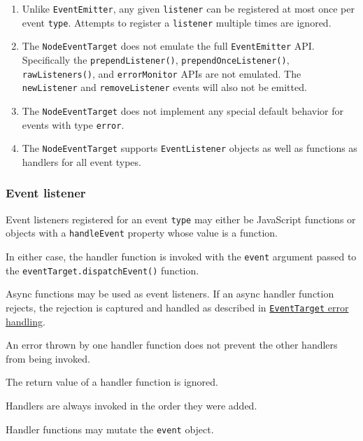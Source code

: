 \begin{enumerate}
\def\labelenumi{\arabic{enumi}.}
\tightlist
\item
  Unlike \texttt{EventEmitter}, any given \texttt{listener} can be
  registered at most once per event \texttt{type}. Attempts to register
  a \texttt{listener} multiple times are ignored.
\item
  The \texttt{NodeEventTarget} does not emulate the full
  \texttt{EventEmitter} API. Specifically the
  \texttt{prependListener()}, \texttt{prependOnceListener()},
  \texttt{rawListeners()}, and \texttt{errorMonitor} APIs are not
  emulated. The \texttt{\textquotesingle{}newListener\textquotesingle{}}
  and \texttt{\textquotesingle{}removeListener\textquotesingle{}} events
  will also not be emitted.
\item
  The \texttt{NodeEventTarget} does not implement any special default
  behavior for events with type
  \texttt{\textquotesingle{}error\textquotesingle{}}.
\item
  The \texttt{NodeEventTarget} supports \texttt{EventListener} objects
  as well as functions as handlers for all event types.
\end{enumerate}

\subsubsection{Event listener}\label{event-listener}

Event listeners registered for an event \texttt{type} may either be
JavaScript functions or objects with a \texttt{handleEvent} property
whose value is a function.

In either case, the handler function is invoked with the \texttt{event}
argument passed to the \texttt{eventTarget.dispatchEvent()} function.

Async functions may be used as event listeners. If an async handler
function rejects, the rejection is captured and handled as described in
\hyperref[eventtarget-error-handling]{\texttt{EventTarget} error
handling}.

An error thrown by one handler function does not prevent the other
handlers from being invoked.

The return value of a handler function is ignored.

Handlers are always invoked in the order they were added.

Handler functions may mutate the \texttt{event} object.


